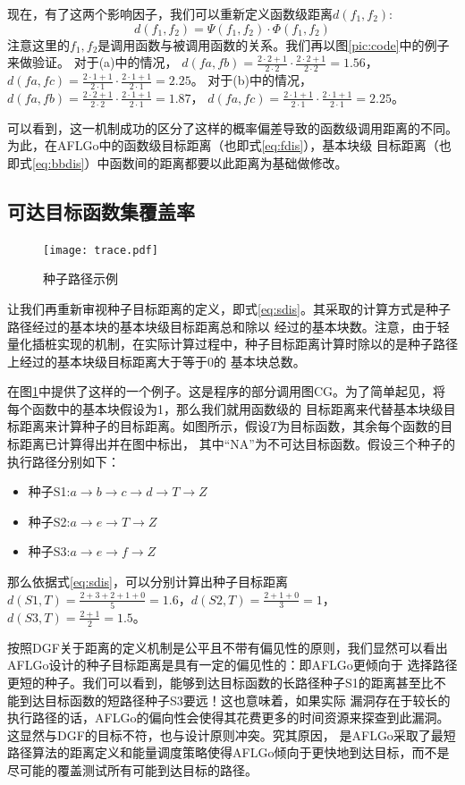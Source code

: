 \documentclass[bachelor]{njupthesis}
\begin{document}
现在，有了这两个影响因子，我们可以重新定义函数级距离$d(f_1,f_2)$:
\begin{equation}
	d(f_1,f_2)=\Psi (f_1,f_2)\cdot \Phi (f_1,f_2) 
\end{equation}
注意这里的$f_1,f_2$是调用函数与被调用函数的关系。我们再以图\ref{pic:code}中的例子来做验证。
对于(a)中的情况，
$d(fa,fb)=\frac{2\cdot 2+1}{2\cdot 2} \cdot \frac{2\cdot 2+1}{2\cdot 2} = 1.56$，
$d(fa,fc)=\frac{2\cdot 1+1}{2\cdot 1} \cdot \frac{2\cdot 1+1}{2\cdot 1} = 2.25$。
对于(b)中的情况，
$d(fa,fb)=\frac{2\cdot 2+1}{2\cdot 2} \cdot \frac{2\cdot 1+1}{2\cdot 1} = 1.87$，
$d(fa,fc)=\frac{2\cdot 1+1}{2\cdot 1} \cdot \frac{2\cdot 1+1}{2\cdot 1} = 2.25$。

可以看到，这一机制成功的区分了这样的概率偏差导致的函数级调用距离的不同。为此，在AFLGo中的函数级目标距离（也即式\ref{eq:fdis}），基本块级
目标距离（也即式\ref{eq:bbdis}）中函数间的距离都要以此距离为基础做修改。

\subsection{可达目标函数集覆盖率}
\begin{figure}[htb]
	\centering
	\texttt{[image: trace.pdf]}
	\caption{种子路径示例}
 	\label{pic:trace}
\end{figure}

让我们再重新审视种子目标距离的定义，即式\ref{eq:sdis}。其采取的计算方式是种子路径经过的基本块的基本块级目标距离总和除以
经过的基本块数。注意，由于轻量化插桩实现的机制，在实际计算过程中，种子目标距离计算时除以的是种子路径上经过的基本块级目标距离大于等于0的
基本块总数。

在图\ref{pic:trace}中提供了这样的一个例子。这是程序的部分调用图CG。为了简单起见，将每个函数中的基本块假设为1，那么我们就用函数级的
目标距离来代替基本块级目标距离来计算种子的目标距离。如图所示，假设$T$为目标函数，其余每个函数的目标距离已计算得出并在图中标出，
其中“NA”为不可达目标函数。假设三个种子的执行路径分别如下：
\begin{itemize}
	\item 种子S1:$a \to b \to c \to d \to T \to Z$
	\item 种子S2:$a \to e \to T \to Z$
	\item 种子S3:$a \to e \to f \to Z$
\end{itemize}
那么依据式\ref{eq:sdis}，可以分别计算出种子目标距离$d(S1,T)=\frac{2+3+2+1+0}{5}=1.6$，$d(S2,T)=\frac{2+1+0}{3}=1$，
$d(S3,T)=\frac{2+1}{2}=1.5$。

按照DGF关于距离的定义机制是公平且不带有偏见性的原则，我们显然可以看出AFLGo设计的种子目标距离是具有一定的偏见性的：即AFLGo更倾向于
选择路径更短的种子。我们可以看到，能够到达目标函数的长路径种子S1的距离甚至比不能到达目标函数的短路径种子S3要远！这也意味着，如果实际
漏洞存在于较长的执行路径的话，AFLGo的偏向性会使得其花费更多的时间资源来探查到此漏洞。这显然与DGF的目标不符，也与设计原则冲突。究其原因，
是AFLGo采取了最短路径算法的距离定义和能量调度策略使得AFLGo倾向于更快地到达目标，而不是尽可能的覆盖测试所有可能到达目标的路径。
\end{document}
